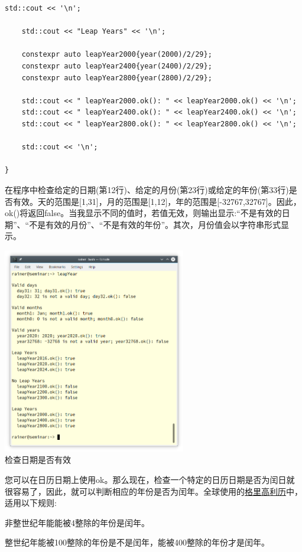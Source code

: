 \begin{lstlisting}[style=styleCXX]
	std::cout << '\n';
	
	std::cout << "Leap Years" << '\n';
	
	constexpr auto leapYear2000{year(2000)/2/29};
	constexpr auto leapYear2400{year(2400)/2/29};
	constexpr auto leapYear2800{year(2800)/2/29};
	
	std::cout << " leapYear2000.ok(): " << leapYear2000.ok() << '\n';
	std::cout << " leapYear2400.ok(): " << leapYear2400.ok() << '\n';
	std::cout << " leapYear2800.ok(): " << leapYear2800.ok() << '\n';
	
	std::cout << '\n';

}
\end{lstlisting}

在程序中检查给定的日期(第12行)、给定的月份(第23行)或给定的年份(第33行)是否有效。天的范围是[1,31]，月的范围是[1,12]，年的范围是[-32767,32767]。因此，ok()将返回false。当我显示不同的值时，若值无效，则输出显示:“不是有效的日期”、“不是有效的月份”、“不是有效的年份”。其次，月份值会以字符串形式显示。

\begin{center}
\includegraphics[width=0.6\textwidth]{content/3/chapter5/images/23.png}\\
检查日期是否有效
\end{center}

您可以在日历日期上使用ok。那么现在，检查一个特定的日历日期是否为闰日就很容易了，因此，就可以判断相应的年份是否为闰年。全球使用的\href{https://en.wikipedia.org/wiki/Gregorian_calendar}{格里高利历}中，适用以下规则:

非整世纪年能能被4整除的年份是闰年。
 
整世纪年能被100整除的年份是不是闰年，能被400整除的年份才是闰年。

